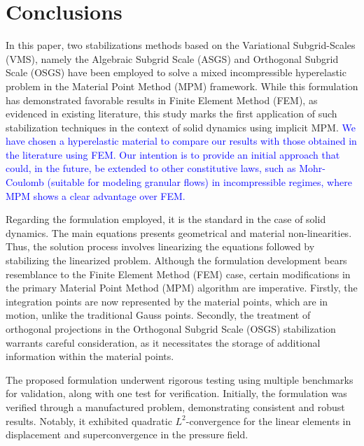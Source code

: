 \documentclass[11pt,english]{article}
\newcommand{\LM}[1]{\textcolor{blue}{#1}}
\begin{document}
%
%

\section{Conclusions} \label{sec:Conclusions}
In this paper, two stabilizations methods based on the Variational Subgrid-Scales (VMS), namely the Algebraic Subgrid Scale (ASGS) and Orthogonal Subgrid Scale (OSGS) have been employed to solve a mixed   incompressible hyperelastic problem in the Material Point Method (MPM) framework. While this formulation has demonstrated favorable results in Finite Element Method (FEM), as evidenced in existing literature, this study marks the first application of such stabilization techniques in the context of solid dynamics using implicit MPM. 
\LM{
We have chosen a hyperelastic material to compare our results with those obtained in the literature using FEM. Our intention is to provide an initial approach that could, in the future, be extended to other constitutive laws, such as Mohr-Coulomb (suitable for modeling granular flows) in incompressible regimes, where MPM shows a clear advantage over FEM.}

Regarding the formulation employed, it is the standard in the case of solid dynamics. The main equations presents geometrical and material non-linearities. Thus, the solution process involves linearizing the equations followed by stabilizing the linearized problem. Although the formulation development bears resemblance to the Finite Element Method (FEM) case, certain modifications in the primary Material Point Method (MPM) algorithm are imperative. Firstly, the integration points are now represented by the material points, which are in motion, unlike the traditional Gauss points. Secondly, the treatment of orthogonal projections in the Orthogonal Subgrid Scale (OSGS) stabilization warrants careful consideration, as it necessitates the storage of additional information within the material points.

The proposed formulation underwent rigorous testing using multiple benchmarks for validation, along with one test for verification. Initially, the formulation was verified through a manufactured problem, demonstrating consistent and robust results. Notably, it exhibited quadratic $L^2$-convergence for the linear elements in displacement and superconvergence in the pressure field.
\end{document}

